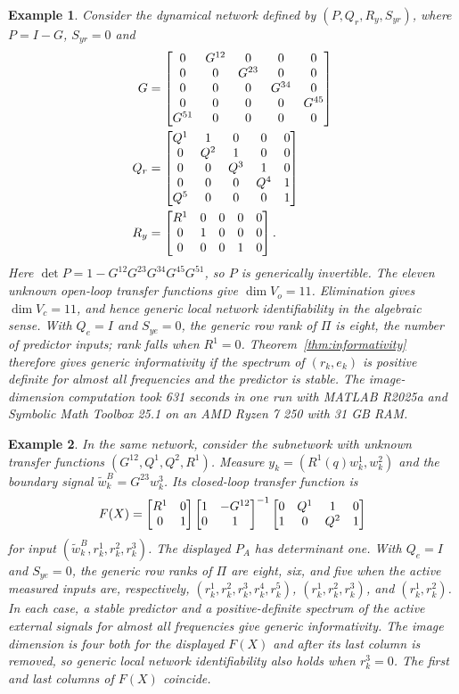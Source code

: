 \documentclass[journal,twoside,web]{ieeecolor}
\newtheorem{exmp}{Example}
\begin{document}
\begin{exmp}
Consider the dynamical network defined by $(P,Q_r,R_y,S_{yr})$, where $P=I-G$, $S_{yr}=0$ and 
%
\begin{align*}
G&=\begin{bmatrix} 0&G^{12}& 0 & 0 & 0\\
        0& 0& G^{23} & 0 &0\\
        0&0&0&G^{34}&0\\
        0&0&0&0&G^{45}\\
        G^{51}&0&0&0&0\end{bmatrix}\\
Q_r&=\begin{bmatrix} Q^1&1&0&0&0\\
        0&Q^2&1&0&0\\
        0&0&Q^3&1&0\\
        0&0&0&Q^4&1\\
        Q^5&0&0&0&1\end{bmatrix}\\
R_y&=\begin{bmatrix} R^1& 0 & 0& 0&0\\
        0& 1&0&0&0\\
        0&0&0&1&0\end{bmatrix}.
\end{align*}
%
Here $\det P=1-G^{12}G^{23}G^{34}G^{45}G^{51}$, so $P$ is
generically invertible.
The eleven unknown open-loop transfer functions give $\dim V_o=11$. Elimination gives
$\dim V_c=11$, and hence generic local network identifiability in the
algebraic sense. With $Q_e=I$ and $S_{ye}=0$, the generic row rank of
$\Pi$ is eight, the number of predictor inputs; rank falls when $R^1=0$.
Theorem~\ref{thm:informativity} therefore gives generic informativity if the spectrum of
$(r_k,e_k)$ is positive definite for almost all frequencies and the
predictor is stable. The image-dimension computation took 631 seconds in
one run with MATLAB R2025a and Symbolic Math Toolbox 25.1 on an AMD Ryzen
7 250 with 31 GB RAM.
%
\end{exmp}
%
\begin{exmp}
In the same network, consider the subnetwork with unknown transfer
functions $(G^{12},Q^1,Q^2,R^1)$. Measure
$y_k=(R^1(q)w_k^1,w_k^2)$ and the boundary signal
$\tilde w_k^B=G^{23}w^3_k$. Its closed-loop transfer function is
%
$$F(X)=\begin{bmatrix} R^1&0\\0&1\end{bmatrix}\begin{bmatrix} 1&-G^{12}\\0&1\end{bmatrix}^{-1}\begin{bmatrix} 0&Q^1&1&0\\1&0&Q^2&1\end{bmatrix}$$
%
for input $(\tilde w_k^B,r_k^1,r_k^2,r_k^3)$. The displayed $P_A$ has
determinant one. With $Q_e=I$ and
$S_{ye}=0$, the generic row ranks of $\Pi$ are eight, six, and five
when the active measured inputs are, respectively,
$(r_k^1,r_k^2,r_k^3,r_k^4,r_k^5)$, $(r_k^1,r_k^2,r_k^3)$, and
$(r_k^1,r_k^2)$.
In each case, a stable predictor and a positive-definite spectrum of the
active external signals for almost all frequencies give generic
informativity. The image dimension is four both for the displayed
$F(X)$ and after its last column is removed, so generic local network
identifiability also holds when $r_k^3=0$. The first and last columns
of $F(X)$ coincide.

\end{exmp}
%
\end{document}
